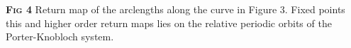 \color{black}
{\footnotesize
\textbf{\textsc{Fig 4}} Return map of the arclengths along the 
curve in Figure 3. Fixed points this and higher order return maps lies on
the relative periodic orbits of the Porter-Knobloch system.}
